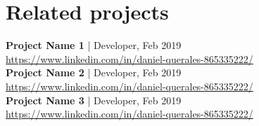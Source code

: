 \documentclass[11pt]{article} %
\begin{document}
\section*{Related projects}

\textbf{Project Name 1} | Developer, Feb 2019 \\ 
{\footnotesize{\url{https://www.linkedin.com/in/daniel-querales-865335222/}}}\\

\textbf{Project Name 2} | Developer, Feb 2019 \\ 
{\footnotesize{\url{https://www.linkedin.com/in/daniel-querales-865335222/}}}\\

\textbf{Project Name 3} | Developer, Feb 2019 \\ 
{\footnotesize{\url{https://www.linkedin.com/in/daniel-querales-865335222/}}}\\

%
%
\end{document}
